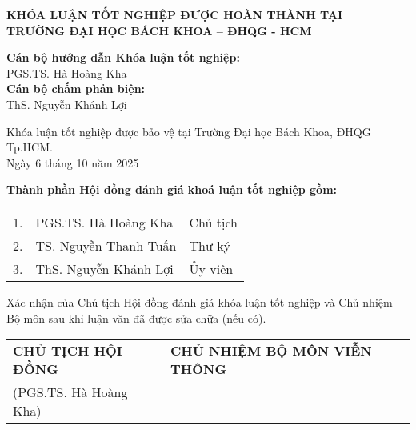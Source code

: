 
\begin{center}
    \textbf{\large KHÓA LUẬN TỐT NGHIỆP ĐƯỢC HOÀN THÀNH TẠI}\\
    \textbf{\large TRƯỜNG ĐẠI HỌC BÁCH KHOA – ĐHQG - HCM}
\end{center}

\vspace{1cm}

\noindent
\textbf{Cán bộ hướng dẫn Khóa luận tốt nghiệp:}\\[0.25cm]
\hspace*{1cm}PGS.TS. Hà Hoàng Kha\\[0.8cm]

\noindent
\textbf{Cán bộ chấm phản biện:}\\[0.25cm]
\hspace*{1cm}ThS. Nguyễn Khánh Lợi\\[1cm]

\vspace{0.4cm}

\noindent
Khóa luận tốt nghiệp được bảo vệ tại Trường Đại học Bách Khoa, ĐHQG Tp.HCM.\\[0.3cm]
\hfill Ngày 6 tháng 10 năm 2025

\vspace{1cm}

\noindent
\textbf{Thành phần Hội đồng đánh giá khoá luận tốt nghiệp gồm:}\\[0.4cm]

\begin{center}
\begin{tabular}{p{0.5cm}p{7cm}p{4cm}}
1. & PGS.TS. Hà Hoàng Kha & Chủ tịch\\[0.3cm]
2. & TS. Nguyễn Thanh Tuấn & Thư ký\\[0.3cm]
3. & ThS. Nguyễn Khánh Lợi & Ủy viên\\
\end{tabular}
\end{center}

\vspace{1cm}

\noindent
Xác nhận của Chủ tịch Hội đồng đánh giá khóa luận tốt nghiệp và Chủ nhiệm Bộ môn sau khi luận văn đã được sửa chữa (nếu có).\\[0.8cm]

\begin{center}
\begin{tabular}{p{6cm}p{6cm}}
\centering \textbf{CHỦ TỊCH HỘI ĐỒNG} & \centering \textbf{CHỦ NHIỆM BỘ MÔN VIỄN THÔNG}\\[2cm]
\centering (PGS.TS. Hà Hoàng Kha) & \\
\end{tabular}
\end{center}
